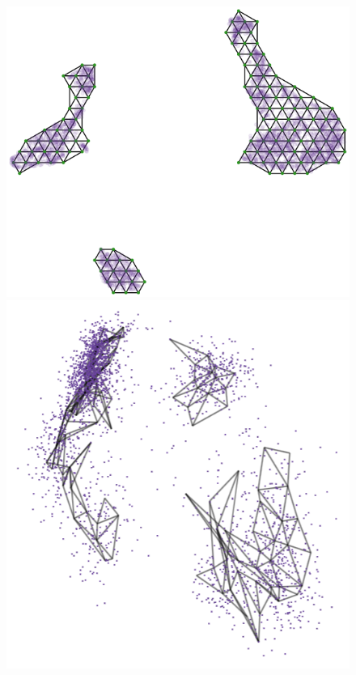 \documentclass[
  12pt]{article}
\begin{document}
\begin{figure}[H]
\begin{minipage}{0.25\linewidth}
\includegraphics{figures/pbmc3k/umap_trimesh_plot.png}\end{minipage}%
%
\begin{minipage}{0.25\linewidth}
\includegraphics{figures/pbmc3k/sc_1.png}\end{minipage}%

\end{figure}
\end{document}
